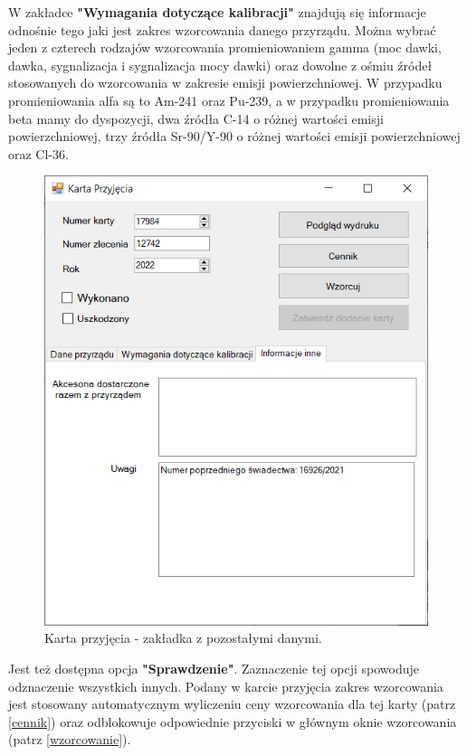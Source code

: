 W zakładce \textbf{"Wymagania dotyczące kalibracji"} znajdują się informacje odnośnie tego jaki jest zakres wzorcowania danego przyrządu. Można wybrać jeden z czterech rodzajów wzorcowania promieniowaniem gamma (moc dawki, dawka, sygnalizacja i sygnalizacja mocy dawki) oraz dowolne z ośmiu źródeł stosowanych do wzorcowania w zakresie emisji powierzchniowej. W przypadku promieniowania alfa są to Am-241 oraz Pu-239, a w przypadku promieniowania beta mamy do dyspozycji, dwa źródła C-14 o różnej wartości emisji powierzchniowej, trzy źródła Sr-90/Y-90 o różnej wartości emisji powierzchniowej oraz Cl-36. 

\begin{figure}[H]
	\centering
	\includegraphics{obrazki/Biuro/karta/karta_dane_inne.png}
	\caption{Karta przyjęcia - zakładka z pozostałymi danymi.}
	\label{kartaDaneInne}
\end{figure}

Jest też dostępna opcja \textbf{"Sprawdzenie"}. Zaznaczenie tej opcji spowoduje odznaczenie wszystkich innych.
Podany w karcie przyjęcia zakres wzorcowania jest stosowany automatycznym wyliczeniu ceny wzorcowania dla tej karty (patrz \ref{cennik}) oraz odblokowuje odpowiednie przyciski w głównym oknie wzorcowania (patrz \ref{wzorcowanie}).

